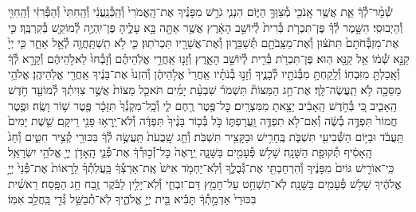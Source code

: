 \documentclass[twoside, openany, parskip=half, 11pt]{book}
\begin{document}
\begin{footnotesize}
\begin{multicols}{2}
שְׁ֯מָ֨ר־לְ֯ךָ֔ אֵ֛ת אֲשֶׁ֥ר אָֽנֹכִ֖י מְ֯צַוְּךָ֣ הַיּ֑וֹם הִנְנִ֧י גֹרֵ֣שׁ מִפָּנֶ֗יךָ אֶת־הָֽאֱמֹרִי֙ וְ֯הַֽכְּ֯נַֽעֲנִ֔י וְ֯הַֽחִתִּי֙ וְ֯הַפְּ֯רִזִּ֔י וְ֯הַֽחִוִּ֖י וְ֯הַיְבוּסִֽי׃ הִשָּׁ֣מֶר לְ֯ךָ֗ פֶּן־תִּכְרֹ֤ת בְּ֯רִית֙ לְ֯יוֹשֵׁ֣ב הָאָ֔רֶץ אֲשֶׁ֥ר אַתָּ֖ה בָּ֣א עָלֶ֑יהָ פֶּן־יִֽהְיֶ֥ה לְ֯מוֹקֵ֖שׁ בְּ֯קִרְבֶּֽךָ׃ כִּ֤י אֶת־מִזְבְּ֯חֹתָם֙ תִּתֹּצ֔וּן וְ֯אֶת־מַצֵּֽבֹתָ֖ם תְּ֯שַׁבֵּר֑וּן וְ֯אֶת־אֲשֵׁרָ֖יו תִּכְרֹתֽוּן׃ כִּ֛י לֹ֥א תִֽשְׁתַּֽחֲוֶ֖ה לְ֯אֵ֣ל אַחֵ֑ר כִּ֤י יְיָ֙ קַנָּ֣א שְׁ֯מ֔וֹ אֵ֥ל קַנָּ֖א הֽוּא׃ פֶּן־תִּכְרֹ֥ת בְּ֯רִ֖ית לְ֯יוֹשֵׁ֣ב הָאָ֑רֶץ וְ֯זָנ֣וּ אַֽחֲרֵ֣י אֱלֹֽהֵיהֶ֗ם וְ֯זָבְ֯חוּ֙ לֵאלֹ֣הֵיהֶ֔ם וְ֯קָרָ֣א לְ֯ךָ֔ וְ֯אָֽכַלְתָּ֖ מִזִּבְחֽוֹ׃ וְ֯לָֽקַחְתָּ֥ מִבְּ֯נֹתָ֖יו לְ֯בָנֶ֑יךָ וְ֯זָנ֣וּ בְ֯נֹתָ֗יו אַֽחֲרֵי֙ אֱלֹ֣הֵיהֶ֔ן וְ֯הִזְנוּ֙ אֶת־בָּנֶ֔יךָ אַֽחֲרֵ֖י אֱלֹֽהֵיהֶֽן׃ אֱלֹהֵ֥י מַסֵּכָ֖ה לֹ֥א תַֽעֲשֶׂה־לָּֽךְ׃  אֶת־חַ֣ג הַמַּצּוֹת֘ תִּשְׁמֹר֒ שִׁבְעַ֨ת יָמִ֜ים תֹּאכַ֤ל מַצּוֹת֙ אֲשֶׁ֣ר צִוִּיתִ֔ךָ לְ֯מוֹעֵ֖ד חֹ֣דֶשׁ הָֽאָבִ֑יב כִּ֚י בְּ֯חֹ֣דֶשׁ הָֽאָבִ֔יב יָצָ֖אתָ מִמִּצְרָֽיִם׃ כׇּל־פֶּ֥טֶר רֶ֖חֶם לִ֑י וְ֯כָֽל־מִקְנְ֯ךָ֙ תִּזָּכָ֔ר פֶּ֖טֶר שׁ֥וֹר וָשֶֽׂה׃ וּפֶ֤טֶר חֲמוֹר֙ תִּפְדֶּ֣ה בְ֯שֶׂ֔ה וְ֯אִם־לֹ֥א תִפְדֶּ֖ה וַֽעֲרַפְתּ֑וֹ כֹּ֣ל בְּ֯כ֤וֹר בָּנֶ֨יךָ֙ תִּפְדֶּ֔ה וְ֯לֹא־יֵֽרָא֥וּ פָנַ֖י רֵיקָֽם׃ שֵׁ֤שֶׁת יָמִים֙ תַּֽעֲבֹ֔ד וּבַיּ֥וֹם הַשְּׁ֯בִיעִ֖י תִּשְׁבֹּ֑ת בֶּֽחָרִ֥ישׁ וּבַקָּצִ֖יר תִּשְׁבֹּֽת׃ וְ֯חַ֤ג שָֽׁבֻעֹת֙ תַּֽעֲשֶׂ֣ה לְ֯ךָ֔ בִּכּוּרֵ֖י קְ֯צִ֣יר חִטִּ֑ים וְ֯חַג֙ הָֽאָסִ֔יף תְּ֯קוּפַ֖ת הַשָּׁנָֽה׃ שָׁל֥שׁ פְּ֯עָמִ֖ים בַּשָּׁנָ֑ה יֵֽרָאֶה֙ כׇּל־זְ֯כ֣וּרְ֯ךָ֔ אֶת־פְּ֯נֵ֛י הָֽאָדֹ֥ן יְיָ֖ אֱלֹהֵ֥י יִשְׂרָאֵֽל׃ כִּֽי־אוֹרִ֤ישׁ גּוֹיִם֙ מִפָּנֶ֔יךָ וְ֯הִרְחַבְתִּ֖י אֶת־גְּ֯בֻלֶ֑ךָ וְ֯לֹֽא־יַחְמֹ֥ד אִישׁ֙ אֶֽת־אַרְצְ֯ךָ֔ בַּֽעֲלֹֽתְ֯ךָ֗ לֵֽרָאוֹת֙ אֶת־פְּ֯נֵי֙ יְיָ֣ אֱלֹהֶ֔יךָ שָׁל֥שׁ פְּ֯עָמִ֖ים בַּשָּׁנָֽה׃ לֹֽא־תִשְׁחַ֥ט עַל־חָמֵ֖ץ דַּם־זִבְחִ֑י וְ֯לֹֽא־יָלִ֣ין לַבֹּ֔קֶר זֶ֖בַח חַ֥ג הַפָּֽסַח׃ רֵאשִׁ֗ית בִּכּוּרֵי֙ אַדְמָ֣תְ֯ךָ֔ תָּבִ֕יא בֵּ֖ית יְיָ֣ אֱלֹהֶ֑יךָ לֹֽא־תְ֯בַשֵּׁ֥ל גְּ֯דִ֖י בַּֽחֲלֵ֥ב אִמּֽוֹ׃



\end{multicols}
\end{footnotesize}
\end{document}
